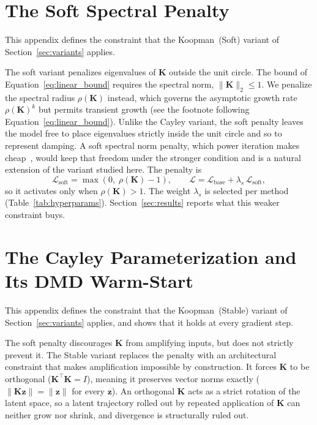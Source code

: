 \documentclass[10pt]{article} %
\newcommand{\K}{\mathbf{K}}
\newcommand{\z}{\bm{z}}
\begin{document}
\section{The Soft Spectral Penalty}
\label{app:soft}
This appendix defines the constraint that the Koopman~(Soft) variant of Section~\ref{sec:variants} applies.

The soft variant penalizes eigenvalues of $\K$ outside the unit circle. The bound of Equation~\ref{eq:linear_bound} requires the spectral norm, $\|\K\|_2 \le 1$. We penalize the spectral radius $\rho(\K)$ instead, which governs the asymptotic growth rate $\rho(\K)^k$ but permits transient growth (see the footnote following Equation~\ref{eq:linear_bound}). Unlike the Cayley variant, the soft penalty leaves the model free to place eigenvalues strictly inside the unit circle and so to represent damping. A soft spectral norm penalty, which power iteration makes cheap~\citep{Miyato2018}, would keep that freedom under the stronger condition and is a natural extension of the variant studied here. The penalty is
\begin{equation}
    \mathcal{L}_\text{soft} = \max(0,\; \rho(\K) - 1),
    \qquad
    \mathcal{L} = \mathcal{L}_\text{base} + \lambda_s\,\mathcal{L}_\text{soft},
    \label{eq:soft_penalty}
\end{equation}
so it activates only when $\rho(\K) > 1$. The weight $\lambda_s$ is selected per method (Table~\ref{tab:hyperparams}). Section~\ref{sec:results} reports what this weaker constraint buys.

\section{The Cayley Parameterization and Its DMD Warm-Start}
\label{app:dmd}
This appendix defines the constraint that the Koopman~(Stable) variant of Section~\ref{sec:variants} applies, and shows that it holds at every gradient step.

The soft penalty discourages $\K$ from amplifying inputs, but does not strictly prevent it. The Stable variant replaces the penalty with an architectural constraint that makes amplification impossible by construction. It forces $\K$ to be orthogonal ($\K^\top \K = I$), meaning it preserves vector norms exactly ($\|\K\z\| = \|\z\|$ for every $\z$). An orthogonal $\K$ acts as a strict rotation of the latent space, so a latent trajectory rolled out by repeated application of $\K$ can neither grow nor shrink, and divergence is structurally ruled out.
\end{document}
